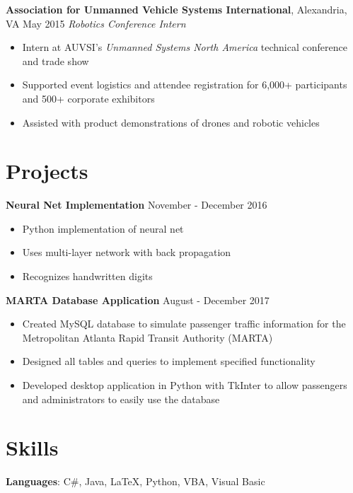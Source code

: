 \documentclass[10pt]{article}
\begin{document}
\vspace{3pt}

\textbf{Association for Unmanned Vehicle Systems International}, Alexandria, VA \hfill May 2015
\linebreak
\textit{Robotics Conference Intern}
\begin{itemize}
    \item Intern at AUVSI's \emph{Unmanned Systems North America} technical conference and trade show
    \item Supported event logistics and attendee registration for 6,000+ participants and 500+ corporate exhibitors
    \item Assisted with product demonstrations of drones and robotic vehicles
\end{itemize}

\section*{Projects}
\textbf{Neural Net Implementation} \hfill November - December 2016
\begin{itemize}
    \item Python implementation of neural net
    \item Uses multi-layer network with back propagation
    \item Recognizes handwritten digits
\end{itemize}

\vspace{3pt}

\textbf{MARTA Database Application} \hfill August - December 2017
\begin{itemize}
    \item Created MySQL database to simulate passenger traffic information for the Metropolitan Atlanta Rapid Transit Authority (MARTA)
    \item Designed all tables and queries to implement specified functionality
    \item Developed desktop application in Python with TkInter to allow passengers and administrators to easily use the database
\end{itemize}

\section*{Skills}
\textbf{Languages}: C\#, Java, \LaTeX, Python, VBA, Visual Basic

\vspace{3pt}
\end{document}
